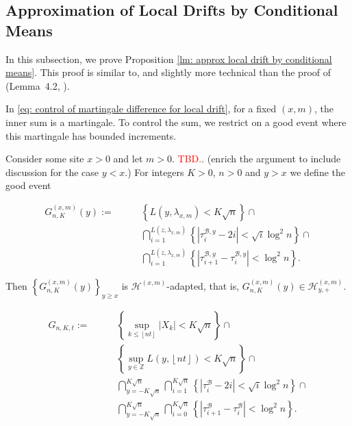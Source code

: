 \documentclass[twoside,12pt,a4paper]{article}
\numberwithin{equation}{section}
\newcommand\TBD{\textcolor{red}{TBD.}}
\begin{document}
\subsection{Approximation of Local Drifts by Conditional Means}
In this subsection, we prove Proposition \ref{lm: approx local drift by conditional means}. This proof is similar to, and slightly more technical than the proof of (Lemma~4.2, \cite{KP16}). 

In \eqref{eq: control of martingale difference for local drift}, for a fixed $(x,m)$, the inner sum is a martingale. To control the sum, we restrict on a good event where this martingale has bounded increments. 

Consider some site $x > 0$ and let $m > 0$. \TBD. (enrich the argument to include discussion for the case $y < x$.) 
For integers $K>0$, $n > 0$ and $y > x$ we define the good event

\begin{align}
	G_{n,K}^{(x,m)}(y) :=  \qquad
		& \left\{ L(y,  \lambda_{x, m}  ) < K \sqrt{n} \right\} \cap \\
		& \bigcap_{i = 1}^{L(z, \lambda_{x, m}) } \left\{\left| \tau_i^{\mathcal{B}, y} - 2 i \right| < \sqrt{ i } \log^2 n \right\}  \cap \\
		& \bigcap_{i = 1}^{L(z, \lambda_{x, m}) } \left\{\left| \tau_{i+1}^{\mathcal{B},y} - \tau_i^{\mathcal{B},y} \right| < \log^2 n \right\}  
.\end{align}

Then  $\left\{G_{n, K}^{(x,m)}(y)\right\}_{y \ge x}$ is $\mathcal{H}^{(x,m)}$-adapted, that is, $G_{n, K}^{(x,m)}(y)\in \mathcal{H}_{y, +}^{(x,m)}$.

\begin{align}
	G_{n,K,t} :=  \qquad
		\label{eqn:good-event-1}
		& \left\{\sup _{k \le \left\lfloor nt  \right\rfloor} |X_k| < K \sqrt{n} \right\} \cap \\
		\label{eqn:good-event-2}
		& \left\{\sup_{y \in \mathbb{Z}} L(y, \left\lfloor nt  \right\rfloor) < K \sqrt{n} \right\} \cap \\
		\label{eqn:good-event-3}
		& \bigcap_{y = - K \sqrt{n} }^{K \sqrt{n}} 
		\bigcap_{i = 1}^{K \sqrt{n} } \left\{\left| \tau_i^{\mathcal{B}} - 2 i \right| < \sqrt{ i } \log^2 n \right\}  \cap \\
		\label{eqn:good-event-4}
		& \bigcap_{y = - K \sqrt{n} }^{K \sqrt{n}} 
		\bigcap_{i = 0}^{K \sqrt{n} } \left\{\left| \tau_{i+1}^{\mathcal{B}} - \tau_i^{\mathcal{B}} \right| < \log^2 n \right\}  
.\end{align}
\end{document}
